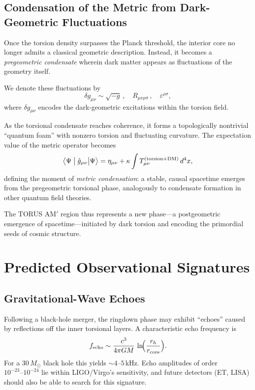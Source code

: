 \documentclass{article}
\begin{document}
\subsection{Condensation of the Metric from Dark-Geometric Fluctuations}
Once the torsion density surpasses the Planck threshold, the interior core no longer admits a classical geometric description. Instead, it becomes a \emph{pregeometric condensate} wherein dark matter appears as fluctuations of the geometry itself.

We denote these fluctuations by
\[
  \delta g_{\mu\nu}
  \sim \sqrt{-g}\,,\quad
  R_{\mu\nu\rho\sigma}\,,\quad
  \varepsilon^{\rho\sigma},
\]
where \(\delta g_{\mu\nu}\) encodes the dark-geometric excitations within the torsion field.

As the torsional condensate reaches coherence, it forms a topologically nontrivial “quantum foam” with nonzero torsion and fluctuating curvature. The expectation value of the metric operator becomes
\[
  \bigl\langle\Psi \bigm|\hat g_{\mu\nu}\bigr|\Psi\bigr\rangle
  = \eta_{\mu\nu}
    + \kappa \int T_{\mu\nu}^{\rm (torsion+DM)}\,d^4x,
\]
defining the moment of \emph{metric condensation}: a stable, causal spacetime emerges from the pregeometric torsional phase, analogously to condensate formation in other quantum field theories.

The TORUS AM$'$ region thus represents a new phase—a postgeometric emergence of spacetime—initiated by dark torsion and encoding the primordial seeds of cosmic structure.

\section{Predicted Observational Signatures}
\label{sec:observational_tests}

\subsection{Gravitational-Wave Echoes}
Following a black-hole merger, the ringdown phase may exhibit “echoes” caused by reflections off the inner torsional layers.  A characteristic echo frequency is
\[
  f_{\rm echo} \sim \frac{c^3}{4\pi G M}\,
    \ln\!\Bigl(\frac{r_h}{r_{\rm core}}\Bigr).
\]
For a \(30\,M_\odot\) black hole this yields \(\sim4\text{–}5\)\,kHz.  Echo amplitudes of order \(10^{-23}\text{–}10^{-24}\) lie within LIGO/Virgo’s sensitivity, and future detectors (ET, LISA) should also be able to search for this signature.
\end{document}
